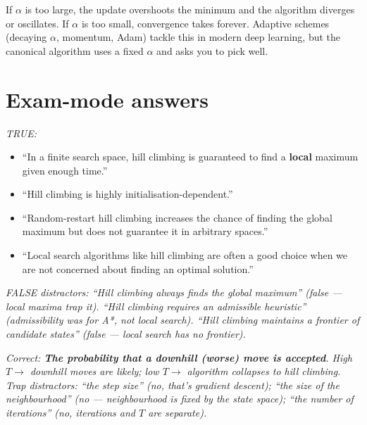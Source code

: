 \documentclass[11pt, a4paper]{article}
\begin{document}
\begin{pitfallbox}
If $\alpha$ is too large, the update overshoots the minimum and the algorithm diverges or oscillates. If $\alpha$ is too small, convergence takes forever. Adaptive schemes (decaying $\alpha$, momentum, Adam) tackle this in modern deep learning, but the canonical algorithm uses a fixed $\alpha$ and asks you to pick well.
\end{pitfallbox}

\section{Exam-mode answers}

\begin{exambox}
\textit{TRUE:}
\begin{itemize}[leftmargin=*, itemsep=0pt, topsep=0pt]
  \item ``In a finite search space, hill climbing is guaranteed to find a \textbf{local} maximum given enough time.''
  \item ``Hill climbing is highly initialisation-dependent.''
  \item ``Random-restart hill climbing increases the chance of finding the global maximum but does not guarantee it in arbitrary spaces.''
  \item ``Local search algorithms like hill climbing are often a good choice when we are not concerned about finding an optimal solution.''
\end{itemize}
\textit{FALSE distractors: ``Hill climbing always finds the global maximum'' (false — local maxima trap it). ``Hill climbing requires an admissible heuristic'' (admissibility was for A*, not local search). ``Hill climbing maintains a frontier of candidate states'' (false — local search has no frontier).}
\end{exambox}

\begin{exambox}
\textit{Correct: \textbf{The probability that a downhill (worse) move is accepted}. High $T \to$ downhill moves are likely; low $T \to$ algorithm collapses to hill climbing.}\\[0.3em]
\textit{Trap distractors: ``the step size'' (no, that's gradient descent); ``the size of the neighbourhood'' (no — neighbourhood is fixed by the state space); ``the number of iterations'' (no, iterations and $T$ are separate).}
\end{exambox}
\end{document}
